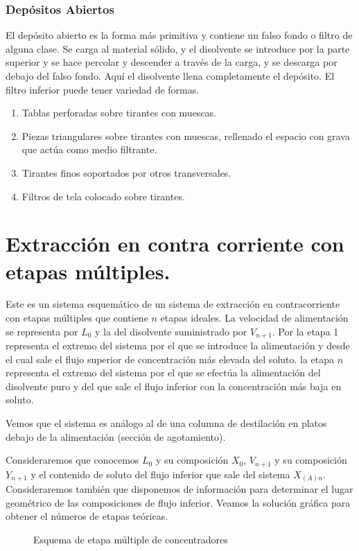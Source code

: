 \documentclass[12pt]{article}
\begin{document}
\subsubsection{Depósitos Abiertos}
El depósito abierto es la forma más primitiva y contiene un falso fondo o filtro de alguna clase. Se carga
al material sólido, y el disolvente se introduce por la parte
superior y se hace percolar y descender a través de la carga, y
se descarga por debajo del falso fondo. Aquí el disolvente llena completamente
el depósito.
El filtro inferior puede tener variedad de formas.
\begin{enumerate}
    \item Tablas perforadas sobre tirantes con muescas.
    \item Piezas triangulares sobre tirantes con muescas, rellenado el espacio con
    grava que actúa como medio filtrante.
    \item Tirantes finos soportados por otros transversales.
    \item Filtros de tela colocado sobre tirantes.
\end{enumerate}

\section{Extracción en contra corriente con etapas múltiples.}

Este es un sistema esquemático de un sistema de extracción en contracorriente con etapas múltiples que contiene $n$ etapas ideales. La velocidad de alimentación se representa por $L_0$ y la del disolvente suministrado por $V_{n+1}$. Por la etapa 1 representa el extremo del sistema por el que se introduce la alimentación y desde el cual sale el flujo superior de concentración más elevada del soluto. la etapa $n$ representa el extremo del sistema por el que se efectúa la alimentación del disolvente puro y del que sale el flujo inferior con la concentración más baja en soluto.
  
Vemos que el sistema es análogo al de una columna de destilación en platos debajo de la alimentación (sección de agotamiento).

Consideraremos que conocemos $L_0$ y su composición $X_0$, $V_{n+1}$ y su composición $Y_{n+1}$ y el contenido de soluto del flujo inferior que sale del sistema  $X_{(A)n}$. Consideraremos también que disponemos de información para determinar el lugar geométrico de las composiciones de flujo inferior. Veamos la solución gráfica para obtener el números de etapas teóricas.
\begin{figure}
    \center
    \tiny  
    
    \caption{Esquema de etapa múltiple de concentradores}
\end{figure}
    
\end{document}
